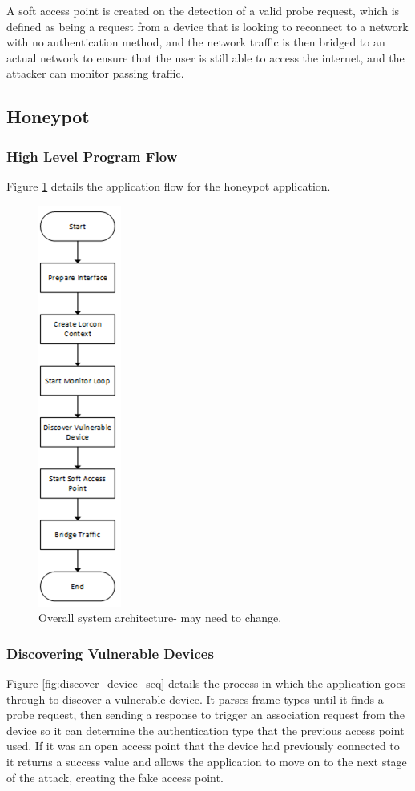 A soft access point is created on the detection of a valid probe request, which is defined as being a request from a device that is looking to reconnect to a network with no authentication method, and the network traffic is then bridged to an actual network to ensure that the user is still able to access the internet, and the attacker can monitor passing traffic.

\subsection{Honeypot}
\subsubsection{High Level Program Flow}
Figure \ref{fig:honeypot_flow} details the application flow for the honeypot application. 

\begin{figure}[h!]
\centering\includegraphics{design/figures/honeypot-flow.png}
\caption{Overall system architecture- may need to change.}
\label{fig:honeypot_flow}
\end{figure}

\subsubsection{Discovering Vulnerable Devices}
Figure \ref{fig:discover_device_seq} details the process in which the application goes through to discover a vulnerable device. It parses frame types until it finds a probe request, then sending a response to trigger an association request from the device so it can determine the authentication type that the previous access point used. If it was an open access point that the device had previously connected to it returns a success value and allows the application to move on to the next  stage of the attack, creating the fake access point.


